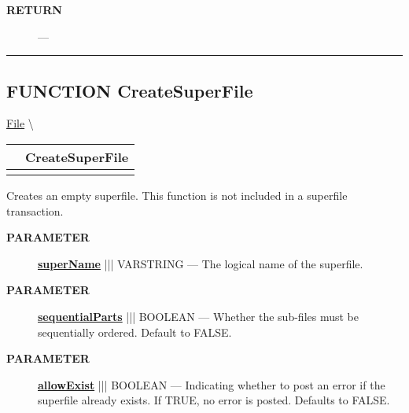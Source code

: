 \par
\begin{description}
\item [\colorbox{tagtype}{\color{white} \textbf{\textsf{RETURN}}}] \textbf{} --- 
\end{description}




\rule{\linewidth}{0.5pt}
\subsection*{\textsf{\colorbox{headtoc}{\color{white} FUNCTION}
CreateSuperFile}}

\hypertarget{ecldoc:file.createsuperfile}{}
\hspace{0pt} \hyperlink{ecldoc:File}{File} \textbackslash 

{\renewcommand{\arraystretch}{1.5}
\begin{tabularx}{\textwidth}{|>{\raggedright\arraybackslash}l|X|}
\hline
\hspace{0pt}\mytexttt{\color{red} } & \textbf{CreateSuperFile} \\
\hline
\multicolumn{2}{|>{\raggedright\arraybackslash}X|}{\hspace{0pt}\mytexttt{\color{param} (varstring superName, boolean sequentialParts=FALSE, boolean allowExist=FALSE)}} \\
\hline
\end{tabularx}
}

\par





Creates an empty superfile. This function is not included in a superfile transaction.






\par
\begin{description}
\item [\colorbox{tagtype}{\color{white} \textbf{\textsf{PARAMETER}}}] \textbf{\underline{superName}} ||| VARSTRING --- The logical name of the superfile.
\item [\colorbox{tagtype}{\color{white} \textbf{\textsf{PARAMETER}}}] \textbf{\underline{sequentialParts}} ||| BOOLEAN --- Whether the sub-files must be sequentially ordered. Default to FALSE.
\item [\colorbox{tagtype}{\color{white} \textbf{\textsf{PARAMETER}}}] \textbf{\underline{allowExist}} ||| BOOLEAN --- Indicating whether to post an error if the superfile already exists. If TRUE, no error is posted. Defaults to FALSE.
\end{description}







